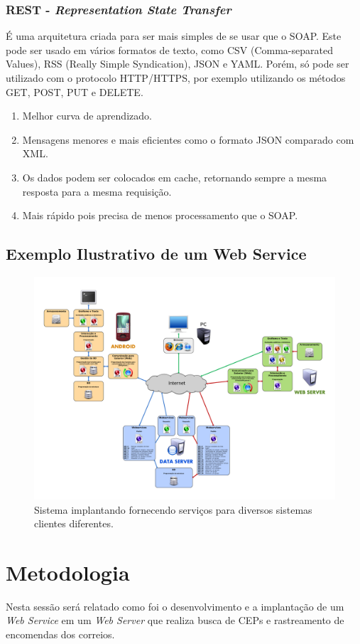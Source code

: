 \documentclass[12pt]{article}
\begin{document}
\subsubsection{REST - \textit{Representation State Transfer}}
É uma arquitetura criada para ser mais simples de se usar que o SOAP. Este pode ser usado em vários formatos de texto, como CSV (Comma-separated Values), RSS (Really Simple Syndication), JSON e YAML. Porém, só pode ser utilizado com o protocolo HTTP/HTTPS, por exemplo utilizando os métodos GET, POST, PUT e DELETE. 

\begin{enumerate}
	\item Melhor curva de aprendizado.
	\item Mensagens menores e mais eficientes como o formato JSON comparado com XML.
	\item Os dados podem ser colocados em cache, retornando sempre a mesma resposta para a mesma requisição.
	\item Mais rápido pois precisa de menos processamento que o SOAP.
\end{enumerate}
\subsection{Exemplo Ilustrativo de um Web Service}
\begin{figure}[H]
	\centering
	\includegraphics[scale=0.18]{Imagens/webservice.png}
	\caption{Sistema implantando fornecendo serviços para diversos sistemas clientes diferentes.}
	\label{wbs}
\end{figure}
\section{Metodologia}
Nesta sessão será relatado como foi o desenvolvimento e a implantação de um \textit{Web Service} em um \textit{Web Server} que realiza busca de CEPs e rastreamento de encomendas dos correios.
 
\end{document}
